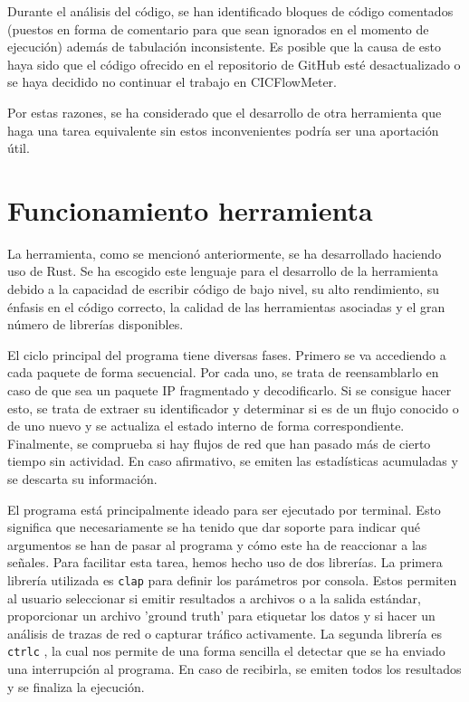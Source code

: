 \documentclass[10pt,a4paper,twoside]{article}
\begin{document}
\begin{multicols*}{2}
    Durante el análisis del código, se han identificado bloques de código comentados (puestos en forma de comentario para que sean ignorados en el momento de ejecución) además de tabulación inconsistente. Es posible que la causa de esto haya sido que el código ofrecido en el repositorio de GitHub esté desactualizado o se haya decidido no continuar el trabajo en CICFlowMeter.

    Por estas razones, se ha considerado que el desarrollo de otra herramienta que haga una tarea equivalente sin estos inconvenientes podría ser una aportación útil.

    \section{Funcionamiento herramienta} \label{funcherramienta}

    La herramienta, como se mencionó anteriormente, se ha desarrollado haciendo uso de Rust. Se ha escogido este lenguaje para el desarrollo de la herramienta debido a la capacidad de escribir código de bajo nivel, su alto rendimiento, su énfasis en el código correcto, la calidad de las herramientas asociadas y el gran número de librerías disponibles.

    El ciclo principal del programa tiene diversas fases. Primero se va accediendo a cada paquete de forma secuencial. Por cada uno, se trata de reensamblarlo en caso de que sea un paquete IP fragmentado y decodificarlo. Si se consigue hacer esto, se trata de extraer su identificador y determinar si es de un flujo conocido o de uno nuevo y se actualiza el estado interno de forma correspondiente. Finalmente, se comprueba si hay flujos de red que han pasado más de cierto tiempo sin actividad. En caso afirmativo, se emiten las estadísticas acumuladas y se descarta su información.

    El programa está principalmente ideado para ser ejecutado por terminal. Esto significa que necesariamente se ha tenido que dar soporte para indicar qué argumentos se han de pasar al programa y cómo este ha de reaccionar a las señales. Para facilitar esta tarea, hemos hecho uso de dos librerías. La primera librería utilizada es \texttt{clap} \cite{Knapp_clap_2024} para definir los parámetros por consola. Estos permiten al usuario seleccionar si emitir resultados a archivos o a la salida estándar, proporcionar un archivo 'ground truth' para etiquetar los datos y si hacer un análisis de trazas de red o capturar tráfico activamente. La segunda librería es \texttt{ctrlc} \cite{controlc}, la cual nos permite de una forma sencilla el detectar que se ha enviado una interrupción al programa. En caso de recibirla, se emiten todos los resultados y se finaliza la ejecución.


\end{multicols*}
\end{document}
